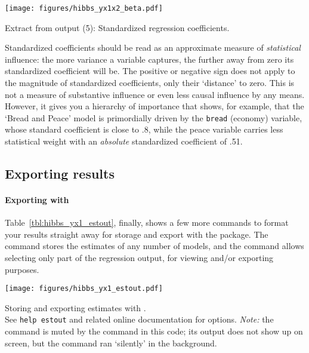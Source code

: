 	\begin{table}[htp]
		\texttt{[image: figures/hibbs\_yx1x2\_beta.pdf]}

	  	\caption[Extract from  output (5): Standardized regression coefficients]{\label{tbl:hibbs_yx1x2_beta}
		Extract from  output (5): Standardized regression coefficients.\\
		}
	\end{table}%
	
	Standardized coefficients should be read as an approximate measure of \emph{statistical} influence: the more variance a variable captures, the further away from zero its standardized coefficient will be. The positive or negative sign does not apply to the magnitude of standardized coefficients, only their `distance' to zero. This is not a measure of substantive influence or even less causal influence by any means. However, it gives you a hierarchy of importance that shows, for example, that the `Bread and Peace' model is primordially driven by the \texttt{bread} (economy) variable, whose standard coefficient is close to .8, while the peace variable carries less statistical weight with an \emph{absolute} standardized coefficient of .51.
  
	\subsection{Exporting results}


\paragraph{Exporting with }%

Table~\ref{tbl:hibbs_yx1_estout}, finally, shows a few more commands to format your results straight away for storage and export with the  package. The  command stores the estimates of any number of models, and the  command allows selecting only part of the regression output, for viewing and/or exporting purposes.

\begin{table}[htp]
	\texttt{[image: figures/hibbs\_yx1\_estout.pdf]}

	\caption[Storing estimates with ]{\label{tbl:hibbs_yx1_estout}
	Storing and exporting estimates with .\\
	See \texttt{help estout} and related online documentation for options. \emph{Note:} the  command is muted by the  command in this code; its output does not show up on screen, but the command ran `silently' in the background. }
\end{table}%

